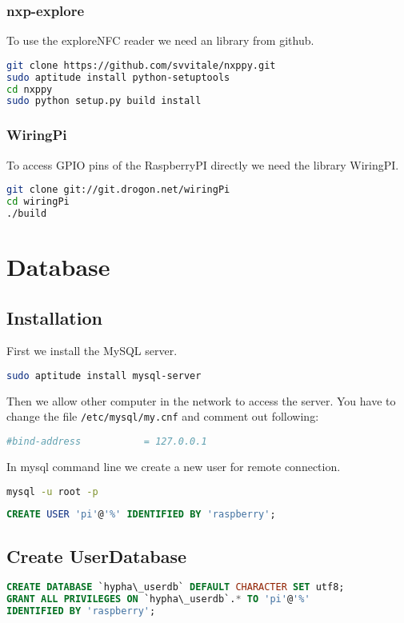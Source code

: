 \documentclass[german,a4paper,11pt]{report}
\begin{document}
\subsection{nxp-explore}
To use the exploreNFC reader we need an library from github.
\begin{lstlisting}[language=bash,caption={compile install nxp-explore}]
git clone https://github.com/svvitale/nxppy.git
sudo aptitude install python-setuptools
cd nxppy
sudo python setup.py build install
\end{lstlisting}

\subsection{WiringPi}
To access GPIO pins of the RaspberryPI directly we need the library WiringPI.
\begin{lstlisting}[language=bash,caption={install wiringpi}]
git clone git://git.drogon.net/wiringPi
cd wiringPi
./build
\end{lstlisting}

\chapter{Database}
\section{Installation}
First we install the MySQL server.
\begin{lstlisting}[language=bash,caption={mysql-server}]
sudo aptitude install mysql-server
\end{lstlisting}
Then we allow other computer in the network to access the server.
You have to change the file \texttt{/etc/mysql/my.cnf} and comment out following:
\begin{lstlisting}[language=bash,caption={/etc/mysql/my.cnf}]
#bind-address           = 127.0.0.1
\end{lstlisting}

In mysql command line we create a new user for remote connection.

\begin{lstlisting}[language=bash,caption={login to mysql}]
mysql -u root -p
\end{lstlisting}
\begin{lstlisting}[language=sql,caption={create mysql user}]
CREATE USER 'pi'@'%' IDENTIFIED BY 'raspberry';
\end{lstlisting}
\section{Create UserDatabase}
\begin{lstlisting}[language=sql,caption={create userdatabase}]
CREATE DATABASE `hypha\_userdb` DEFAULT CHARACTER SET utf8;
GRANT ALL PRIVILEGES ON `hypha\_userdb`.* TO 'pi'@'%'
IDENTIFIED BY 'raspberry';
\end{lstlisting}
\end{document}

